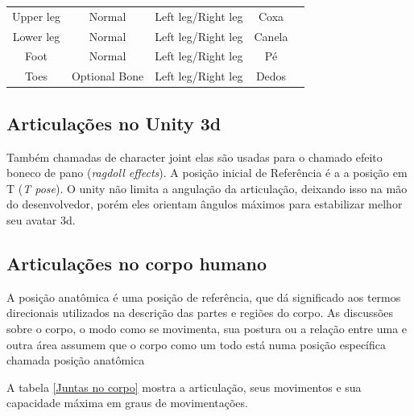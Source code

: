 \begin{table}[]
\begin{tabular}{|c|c|c|c|c}
Upper leg                    & Normal                       & Left leg/Right leg            & Coxa                                &  \\ \cline{1-4}
Lower leg                    & Normal                       & Left leg/Right leg            & Canela                              &  \\ \cline{1-4}
Foot                         & Normal                       & Left leg/Right leg            & Pé                                  &  \\ \cline{1-4}
Toes                         & Optional Bone                & Left leg/Right leg            & Dedos                                  &  \\ \cline{1-4}
\end{tabular}
\end{table} 

\subsection{Articulações no Unity 3d}
\label{Sec:Articulacoes no Unity 3d}
  Também chamadas de character joint elas são usadas para o chamado efeito 
boneco de pano (\textit{ragdoll effects}). A posição inicial de Referência é a 
a posição em T (\textit{T pose}). O unity não limita a angulação da articulação, 
deixando isso na mão do desenvolvedor, porém eles orientam ângulos máximos 
para estabilizar melhor seu avatar 3d.\cite{unity3dManual}

\subsection{Articulações no corpo humano}
\label{Sec:Juntas no corpo humano}
 A posição anatômica é uma posição de referência, que dá significado aos termos
 direcionais utilizados na descrição das partes e regiões do corpo. As discussões
 sobre o corpo, o modo como se movimenta, sua postura ou a relação entre uma e 
outra área assumem que o corpo como um todo está numa posição específica chamada
 posição anatômica 

  A tabela \ref{Juntas no corpo} mostra a articulação, seus movimentos e sua capacidade máxima em
graus de movimentações.

